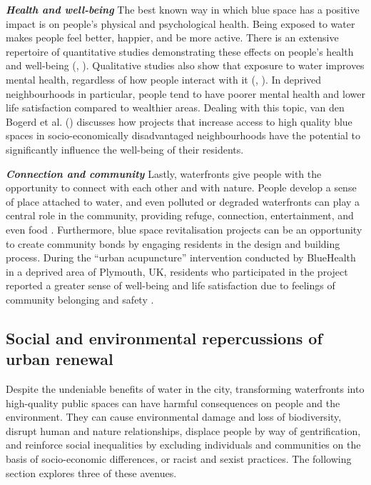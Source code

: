 \documentclass{article}
\newcommand{\bisection}[1]{\textbf{\textit{#1}}}
\begin{document}
\bisection{Health and well-being}
The best known way in which blue space has a positive impact is on people's physical and psychological health. Being exposed to water makes people feel better, happier, and be more active. 
There is an extensive repertoire of quantitative studies demonstrating these effects on people's health and well-being (\cite{gascon2017outdoor}, \cite{britton2020blue}).
Qualitative studies also show that exposure to water improves mental health, regardless of how people interact with it (\cite{garrett2019urban}, \cite{van2021urban}).
In deprived neighbourhoods in particular, people tend to have poorer mental health and lower life satisfaction compared to wealthier areas. Dealing with this topic, van den Bogerd et al. (\citeyear{van2021urban}) discusses how projects that increase access to high quality blue spaces in socio-economically disadvantaged neighbourhoods have the potential to significantly influence the well-being of their residents.

\bisection{Connection and community}
Lastly, waterfronts give people with the opportunity to connect with each other and with nature. People develop a sense of place attached to water, and even polluted or degraded waterfronts can play a central role in the community, providing refuge, connection, entertainment, and even food \parencite{toomey2021place}. 
Furthermore, blue space revitalisation projects can be an opportunity to create community bonds by engaging residents in the design and building process. During the ``urban acupuncture'' intervention conducted by BlueHealth in a deprived area of Plymouth, UK, residents who participated in the project reported a greater sense of well-being and life satisfaction due to feelings of community belonging and safety \parencite{van2021urban}.


\subsection{Social and environmental repercussions of urban renewal}

Despite the undeniable benefits of water in the city, transforming waterfronts into high-quality public spaces can have harmful consequences on people and the environment. They can cause environmental damage and loss of biodiversity, disrupt human and nature relationships, displace people by way of gentrification, and reinforce social inequalities by excluding individuals and communities on the basis of socio-economic differences, or racist and sexist practices. The following section explores three of these avenues.
\end{document}
